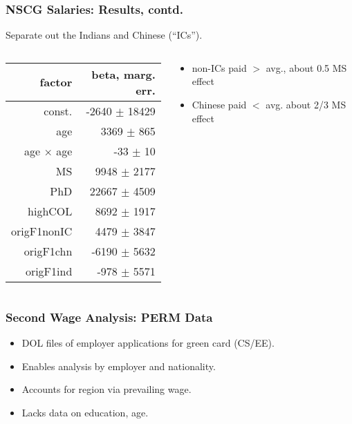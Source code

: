 \documentclass{beamer}
\begin{document}
\begin{frame}
\frametitle{NSCG Salaries: Results, contd.}

Separate out the Indians and Chinese (``ICs''). 
\pause

\medskip

\begin{columns}

  \begin{column}{0.5\textwidth}
   \begin{tabular}{|r|r|}
   \hline
   factor & beta, marg. err.  \\ \hline
   \hline
   const. & -2640 {\footnotesize $\pm$ 18429} \\ \hline
   age & 3369 {\footnotesize $\pm$ 865} \\ \hline
   age $\times$ age & -33 {\footnotesize $\pm$ 10} \\ \hline
   MS & 9948 {\footnotesize $\pm$ 2177} \\ \hline
   PhD & 22667 {\footnotesize $\pm$ 4509} \\ \hline
   highCOL & 8692 {\footnotesize $\pm$ 1917} \\ \hline
   origF1nonIC & 4479 {\footnotesize $\pm$ 3847} \\ \hline
   origF1chn & -6190 {\footnotesize $\pm$ 5632} \\ \hline
   origF1ind & -978 {\footnotesize $\pm$ 5571} \\ \hline
   \end{tabular}
  \end{column}
  
  \begin{column}{0.5\textwidth}
  \pause
  \begin{itemize}
  \item non-ICs paid $>$ avg., about 0.5 MS effect
  \pause
  \item Chinese paid $<$ avg. about 2/3 MS effect
  \end{itemize}
  \end{column}

\end{columns}

\end{frame}

\begin{frame}
\frametitle{Second Wage Analysis:  PERM Data}

\pause

\begin{itemize}

\item DOL files of employer applications for green card (CS/EE). 
\pause

\item Enables analysis by employer and nationality.
\pause

\item Accounts for region via prevailing wage.
\pause

\item Lacks data on education, age.

\end{itemize}

\end{frame}
\end{document}

